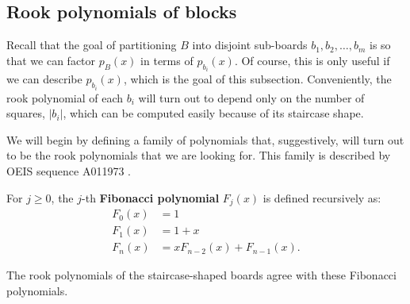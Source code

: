 

\subsection{Rook polynomials of blocks}
Recall that the goal of partitioning $B$ into disjoint sub-boards
$b_1, b_2, \dots, b_m$ is so that we can
factor $p_B(x)$ in terms of $p_{b_i}(x)$.
Of course, this is only useful if we can describe $p_{b_i}(x)$,
which is the goal of this subsection.
Conveniently, the rook polynomial of each $b_i$ will turn out to depend only on the
number of squares, $|b_i|$, which can be computed easily because of its
staircase shape.

We will begin by defining a family of polynomials that, suggestively, will turn
out to be the rook polynomials that we are looking for.
This family is described by OEIS sequence A011973 \cite{oeis}.
\begin{definition}
  For $j \geq 0$, the $j$-th \textbf{Fibonacci polynomial} $F_{j}(x)$ is defined recursively as:
  \begin{align}
    F_0(x) &= 1 \\
    F_1(x) &= 1 + x \\
    F_n(x) &= xF_{n-2}(x) + F_{n-1}(x).
  \end{align}
\label{def:FibonacciPolynomial}
\end{definition}

The rook polynomials of the staircase-shaped boards agree with these Fibonacci
polynomials.

